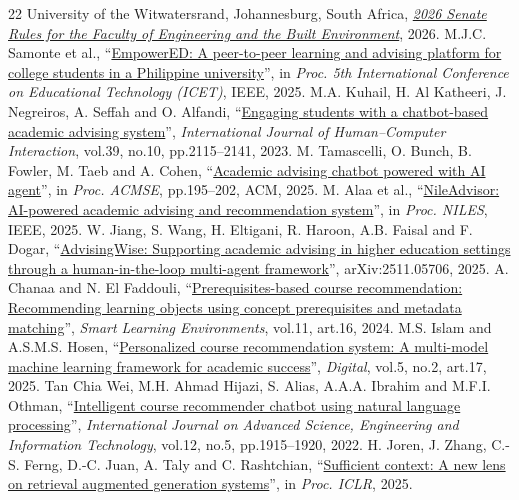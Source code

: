 \begin{thebibliography}{22}
 University of the Witwatersrand, Johannesburg, South Africa, \href{https://www.wits.ac.za/media/wits-university/students/academic-matters/documents/EBE_eBook.pdf}{\emph{2026 Senate Rules for the Faculty of Engineering and the Built Environment}}, 2026.
 M.J.C. Samonte et al., ``\href{https://doi.org/10.1109/ICET67421.2025.11380449}{EmpowerED: A peer-to-peer learning and advising platform for college students in a Philippine university}'', in \emph{Proc. 5th International Conference on Educational Technology (ICET)}, IEEE, 2025.
 M.A. Kuhail, H. Al Katheeri, J. Negreiros, A. Seffah and O. Alfandi, ``\href{https://doi.org/10.1080/10447318.2022.2074645}{Engaging students with a chatbot-based academic advising system}'', \emph{International Journal of Human--Computer Interaction}, vol.39, no.10, pp.2115--2141, 2023.
 M. Tamascelli, O. Bunch, B. Fowler, M. Taeb and A. Cohen, ``\href{https://doi.org/10.1145/3696673.3723065}{Academic advising chatbot powered with AI agent}'', in \emph{Proc. ACMSE}, pp.195--202, ACM, 2025.
 M. Alaa et al., ``\href{https://doi.org/10.1109/NILES68063.2025.11232041}{NileAdvisor: AI-powered academic advising and recommendation system}'', in \emph{Proc. NILES}, IEEE, 2025.
 W. Jiang, S. Wang, H. Eltigani, R. Haroon, A.B. Faisal and F. Dogar, ``\href{https://arxiv.org/abs/2511.05706}{AdvisingWise: Supporting academic advising in higher education settings through a human-in-the-loop multi-agent framework}'', arXiv:2511.05706, 2025.
 A. Chanaa and N. El Faddouli, ``\href{https://doi.org/10.1186/s40561-024-00301-0}{Prerequisites-based course recommendation: Recommending learning objects using concept prerequisites and metadata matching}'', \emph{Smart Learning Environments}, vol.11, art.16, 2024.
 M.S. Islam and A.S.M.S. Hosen, ``\href{https://doi.org/10.3390/digital5020017}{Personalized course recommendation system: A multi-model machine learning framework for academic success}'', \emph{Digital}, vol.5, no.2, art.17, 2025.
 Tan Chia Wei, M.H. Ahmad Hijazi, S. Alias, A.A.A. Ibrahim and M.F.I. Othman, ``\href{https://doi.org/10.18517/ijaseit.12.5.14798}{Intelligent course recommender chatbot using natural language processing}'', \emph{International Journal on Advanced Science, Engineering and Information Technology}, vol.12, no.5, pp.1915--1920, 2022.
 H. Joren, J. Zhang, C.-S. Ferng, D.-C. Juan, A. Taly and C. Rashtchian, ``\href{https://proceedings.iclr.cc/paper_files/paper/2025/file/33dffa2e3d2ab74a783d1a8c292f66d9-Paper-Conference.pdf}{Sufficient context: A new lens on retrieval augmented generation systems}'', in \emph{Proc. ICLR}, 2025.

\end{thebibliography}
